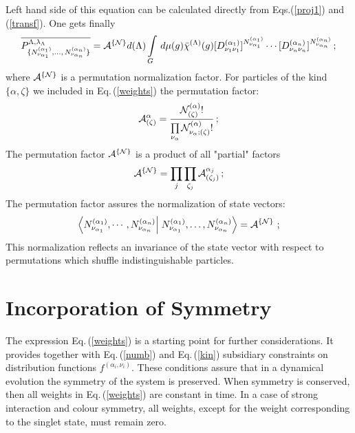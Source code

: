 \documentclass[a4paper,11pt]{article}
\begin{document}
Left hand side of this equation can be calculated directly from
Eqs.(\ref{proj1}) and (\ref{transf}). One gets finally
\begin{equation}
 \overline{P^{\Lambda,\lambda_{\Lambda}}_{\{N^{(\alpha_1)}_{\nu_{\alpha_1}},
\dots,\,N^{(\alpha_n)}_{\nu_{\alpha_n}}\}}}
  =
{\cal A}^{\{{\cal N}\}}
d(\Lambda)\int\limits_G\,d\mu(g)\bar\chi^{(\Lambda)}(g)
[D^{(\alpha_1)}_{\nu_1\nu_1}]^{N^{(\alpha_1)}_{\nu_{\alpha_1}}}\cdots
[D^{(\alpha_n)}_{\nu_n\nu_n}]^{N^{(\alpha_n)}_{\nu_{\alpha_n}}}\,;
\label{weights}
\end{equation}
where ${\cal A}^{\{{\cal N}\}}$ is a permutation normalization
factor. For particles of the kind $\{\alpha,\zeta\}$ we included
in Eq.\,(\ref{weights}) the permutation factor:
\begin{equation}\label{permfac1}
{\cal A}^\alpha_{(\zeta)}= \frac{{\cal
N}^{(\alpha)}_{(\zeta)}!}{\prod\limits_{\nu_\alpha} {\cal
N}^{(\alpha)}_{\nu_\alpha;(\zeta)}!}\,;
\end{equation}
The permutation factor ${\cal A}^{\{{\cal N}\}}$ is a product of
all "partial" factors
\begin{equation}\label{permfactor}
{\cal A}^{\{{\cal N}\}}= \prod\limits_j\prod_{\zeta_j}{\cal
A}^{\alpha_j}_{(\zeta_j)}\,;
\end{equation}
The permutation factor assures the normalization of state vectors:
\begin{equation}
\left\langle N^{(\alpha_1)}_{\nu_{\alpha_1}},
\cdots,N^{(\alpha_n)}_{\nu_{\alpha_n}}\right\vert \left.
N^{(\alpha_1)}_{\nu_{\alpha_1}},\dots,
N^{(\alpha_n)}_{\nu_{\alpha_n}}\right\rangle={\cal A}^{\{{\cal
N}\}}\ ; \label{norm}
\end{equation}
This normalization reflects an invariance of the state vector with
respect to permutations which shuffle indistinguishable particles.
\section{\normalsize\bf Incorporation of Symmetry}\label{sym}
\noindent The expression Eq.\,(\ref{weights}) is a starting point
for further considerations. It provides together with
Eq.\,(\ref{numb}) and
 Eq.\,(\ref{kin}) subsidiary constraints on distribution functions
$f^{(\alpha_i,\nu_i)}$. These conditions assure that in a
dynamical evolution the symmetry of the system is preserved. When
symmetry is conserved, then all weights in Eq.\,(\ref{weights})
are constant in time. In a case of strong interaction and colour
symmetry, all weights, except for the weight corresponding to the
singlet state, must remain zero.
\end{document}
